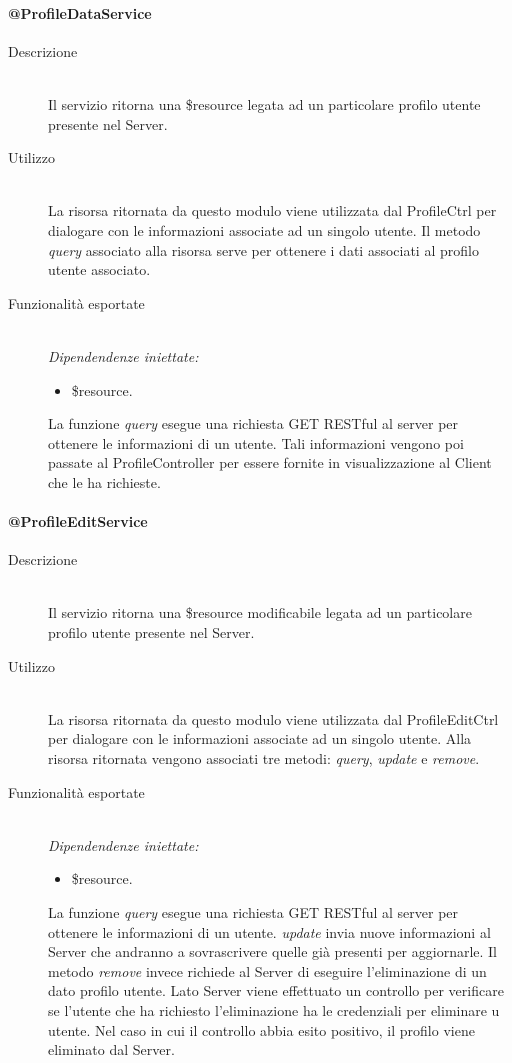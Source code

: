 \paragraph{@ProfileDataService}
\begin{description}
 \item[Descrizione] \hfill \\
 Il servizio ritorna una \$resource legata ad un particolare profilo utente presente nel Server.
 \item[Utilizzo] \hfill \\
 La risorsa ritornata da questo modulo viene utilizzata dal ProfileCtrl per dialogare con le informazioni associate ad un singolo utente.
 Il metodo \textit{query} associato alla risorsa serve per ottenere i dati associati al profilo utente associato.
 \item[Funzionalità esportate] \hfill \\
 \emph{Dipendendenze iniettate:}
 \begin{itemize}
  \item \$resource.
 \end{itemize}
 La funzione \textit{query} esegue una richiesta GET RESTful al server per ottenere le informazioni di un utente. Tali informazioni vengono 
 poi passate al ProfileController per essere fornite in visualizzazione al Client che le ha richieste.
\end{description}

\paragraph{@ProfileEditService}
\begin{description}
 \item[Descrizione] \hfill \\
 Il servizio ritorna una \$resource modificabile legata ad un particolare profilo utente presente nel Server.
 \item[Utilizzo] \hfill \\
 La risorsa ritornata da questo modulo viene utilizzata dal ProfileEditCtrl per dialogare con le informazioni associate ad un singolo utente.
 Alla risorsa ritornata vengono associati tre metodi: \textit{query}, \textit{update} e \textit{remove}.
 \item[Funzionalità esportate] \hfill \\
 \emph{Dipendendenze iniettate:}
 \begin{itemize}
  \item \$resource.
 \end{itemize}
 La funzione \textit{query} esegue una richiesta GET RESTful al server per ottenere le informazioni di un utente. \textit{update} invia 
 nuove informazioni al Server che andranno a sovrascrivere quelle già presenti per aggiornarle. Il metodo \textit{remove} invece richiede al 
 Server di eseguire l'eliminazione di un dato profilo utente. Lato Server viene effettuato un controllo per verificare se l'utente che 
 ha richiesto l'eliminazione ha le credenziali per eliminare u utente. Nel caso in cui il controllo abbia esito positivo, il profilo
 viene eliminato dal Server.
\end{description}

